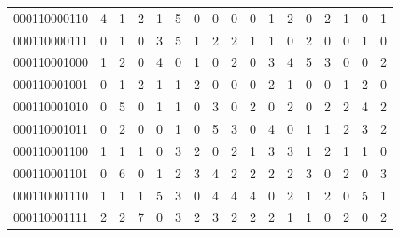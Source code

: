 \documentclass[10pt,a4paper]{article}
\begin{document}
\begin{longtable}{ |c|c|c|c|c|c|c|c|c|c|c|c|c|c|c|c|c| }
    000110000110              & 4                            & 1                                & 2                            & 1                              & 5   & 0   & 0   & 0   & 0   & 1   & 2   & 0   & 2   & 1   & 0   & 1   \\
    000110000111              & 0                            & 1                                & 0                            & 3                              & 5   & 1   & 2   & 2   & 1   & 1   & 0   & 2   & 0   & 0   & 1   & 0   \\
    000110001000              & 1                            & 2                                & 0                            & 4                              & 0   & 1   & 0   & 2   & 0   & 3   & 4   & 5   & 3   & 0   & 0   & 2   \\
    000110001001              & 0                            & 1                                & 2                            & 1                              & 1   & 2   & 0   & 0   & 0   & 2   & 1   & 0   & 0   & 1   & 2   & 0   \\
    000110001010              & 0                            & 5                                & 0                            & 1                              & 1   & 0   & 3   & 0   & 2   & 0   & 2   & 0   & 2   & 2   & 4   & 2   \\
    000110001011              & 0                            & 2                                & 0                            & 0                              & 1   & 0   & 5   & 3   & 0   & 4   & 0   & 1   & 1   & 2   & 3   & 2   \\
    000110001100              & 1                            & 1                                & 1                            & 0                              & 3   & 2   & 0   & 2   & 1   & 3   & 3   & 1   & 2   & 1   & 1   & 0   \\
    000110001101              & 0                            & 6                                & 0                            & 1                              & 2   & 3   & 4   & 2   & 2   & 2   & 2   & 3   & 0   & 2   & 0   & 3   \\
    000110001110              & 1                            & 1                                & 1                            & 5                              & 3   & 0   & 4   & 4   & 4   & 0   & 2   & 1   & 2   & 0   & 5   & 1   \\
    000110001111              & 2                            & 2                                & 7                            & 0                              & 3   & 2   & 3   & 2   & 2   & 2   & 1   & 1   & 0   & 2   & 0   & 2   \\

\end{longtable}
\end{document}
